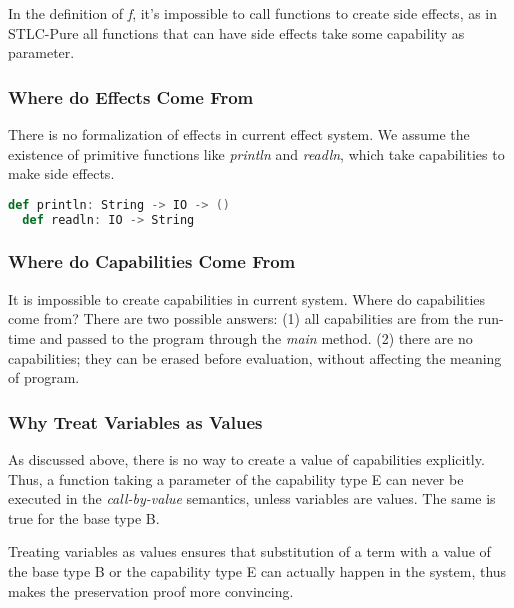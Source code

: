 In the definition of \emph{f}, it's impossible to call functions to
create side effects, as in STLC-Pure all functions that can have side
effects take some capability as parameter.

\subsubsection{Where do Effects Come From}

There is no formalization of effects in current effect system. We
assume the existence of primitive functions like \emph{println} and
\emph{readln}, which take capabilities to make side effects.

\begin{lstlisting}[language=Scala]
  def println: String -> IO -> ()
  def readln: IO -> String
\end{lstlisting}



\subsubsection{Where do Capabilities Come From}

It is impossible to create capabilities in current system. Where do
capabilities come from?  There are two possible answers: (1) all
capabilities are from the run-time and passed to the program through
the \emph{main} method. (2) there are no capabilities; they can be
erased before evaluation, without affecting the meaning of program.


\subsubsection{Why Treat Variables as Values}

As discussed above, there is no way to create a value of capabilities
explicitly. Thus, a function taking a parameter of the capability type
E can never be executed in the \emph{call-by-value} semantics, unless
variables are values. The same is true for the base type B.

Treating variables as values ensures that substitution of a term with
a value of the base type B or the capability type E can actually
happen in the system, thus makes the preservation proof more
convincing.


